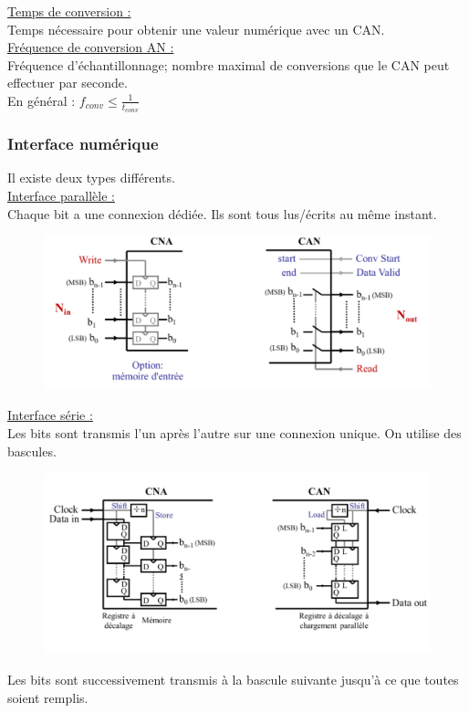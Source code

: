 \documentclass[../main.tex]{subfiles}
\begin{document}
\quad \underline{Temps de conversion :}\\
Temps nécessaire pour obtenir une valeur numérique avec un CAN.\\

\quad \underline{Fréquence de conversion AN :}\\
Fréquence d'échantillonnage; nombre maximal de conversions que le CAN peut effectuer par seconde.\\
En général : $f_{conv} \leq \frac{1}{t_{conv}}$\\

\subsubsection{Interface numérique}
Il existe deux types différents.\\


\quad \underline{Interface parallèle :}\\
Chaque bit a une connexion dédiée. Ils sont tous lus/écrits au même instant.\\


\begin{figure}[hbt!]
    \centering
    \includegraphics[width=.6\textwidth]{IMAGES/elec/IMG_0162.jpeg}
\end{figure}

\quad \underline{Interface série :}\\
Les bits sont transmis l'un après l'autre sur une connexion unique. On utilise des bascules.\\

\begin{figure}[hbt!]
    \centering
    \includegraphics[width=.6\textwidth]{IMAGES/elec/IMG_0163.jpeg}
\end{figure}
Les bits sont successivement transmis à la bascule suivante jusqu'à ce que toutes soient remplis.\\
\end{document}
